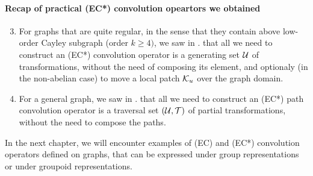 \paragraph{Recap of practical (EC*) convolution opeartors we obtained}
\begin{enumerate}
  \setcounter{enumi}{2}
\item For graphs that are quite regular, in the sense that they contain above low-order Cayley subgraph (order $k \geq 4)$, we saw in . that all we need to construct an (EC*) convolution operator is a generating set $\mathcal{U}$ of transformations, without the need of composing its element, and optionaly (in the non-abelian case) to move a local patch $\mathcal{K}_u$ over the graph domain.
\item For a general graph, we saw in . that all we need to construct an (EC*) path convolution operator is a traversal set $(\mathcal{U}, \mathcal{T})$ of partial transformations, without the need to compose the paths.
\end{enumerate}

In the next chapter, we will encounter examples of (EC) and (EC*) convolution operators defined on graphs, that can be expressed under group representations or under groupoid representations.
